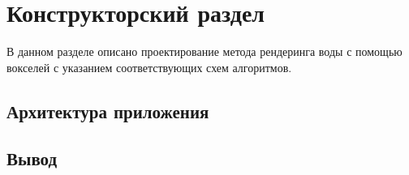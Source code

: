 \chapter{Конструкторский раздел}
\label{cha:design}

В данном разделе описано проектирование метода рендеринга воды с помощью вокселей
с указанием соответствующих схем алгоритмов.

\section{Архитектура приложения}

\section{Вывод}


